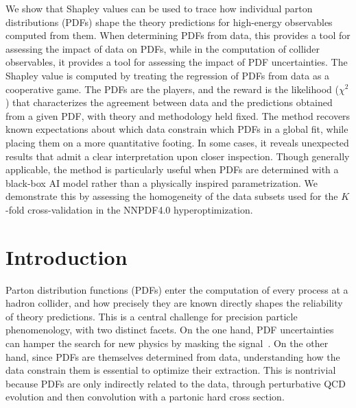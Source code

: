 \documentclass[11pt,a4paper]{article}
\begin{document}
We show that Shapley values can be used to trace how individual parton distributions (PDFs) shape the theory predictions for high-energy observables computed from them.
When determining PDFs from data, this provides a tool for assessing the impact of data on PDFs, while in the computation of collider observables, it provides a tool for assessing the impact of PDF uncertainties.
The Shapley value is computed by treating the regression of PDFs from data as a cooperative game. 
The PDFs are the players, and the reward is the likelihood ($\chi^2$) that characterizes the agreement between data and the predictions obtained from a given PDF, with theory and methodology held fixed. 
The method recovers known expectations about which data constrain which PDFs in a global fit, while placing them on a more quantitative footing. 
In some cases, it reveals unexpected results that admit a clear interpretation upon closer inspection. 
Though generally applicable, the method is particularly useful when PDFs are determined with a black-box AI model rather than a physically inspired parametrization. 
We demonstrate this by assessing the homogeneity of the data subsets used for the $K$-fold cross-validation in the NNPDF4.0 hyperoptimization.



\clearpage

\tableofcontents 



\clearpage
\section{Introduction}
\label{sec:intro}

Parton distribution functions (PDFs) enter the computation of every process at a hadron collider, and how precisely they are known directly shapes the reliability of theory predictions.
This is a central challenge for precision particle phenomenology, with two distinct facets.
On the one hand, PDF uncertainties can hamper the search for new physics by masking the signal~\cite{Cole:2026eex}. 
On the other hand, since PDFs are themselves determined from data, understanding how the data constrain them is essential to optimize their extraction.  
This is nontrivial because PDFs are only indirectly related to the data, through perturbative QCD evolution and then convolution with a partonic hard cross section.
\end{document}
